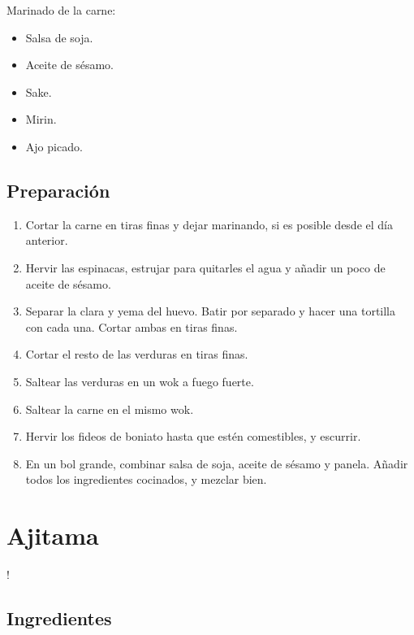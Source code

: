 \documentclass[
]{book}
\providecommand{\tightlist}{%
  \setlength{\itemsep}{0pt}\setlength{\parskip}{0pt}}
\begin{document}
Marinado de la carne:

\begin{itemize}
\tightlist
\item
  Salsa de soja.
\item
  Aceite de sésamo.
\item
  Sake.
\item
  Mirin.
\item
  Ajo picado.
\end{itemize}

\hypertarget{preparaciuxf3n-6}{%
\section*{Preparación}\label{preparaciuxf3n-6}}

\begin{enumerate}
\def\labelenumi{\arabic{enumi}.}
\tightlist
\item
  Cortar la carne en tiras finas y dejar marinando, si es posible desde el día anterior.
\item
  Hervir las espinacas, estrujar para quitarles el agua y añadir un poco de aceite de sésamo.
\item
  Separar la clara y yema del huevo. Batir por separado y hacer una tortilla con cada una. Cortar ambas en tiras finas.
\item
  Cortar el resto de las verduras en tiras finas.
\item
  Saltear las verduras en un wok a fuego fuerte.
\item
  Saltear la carne en el mismo wok.
\item
  Hervir los fideos de boniato hasta que estén comestibles, y escurrir.
\item
  En un bol grande, combinar salsa de soja, aceite de sésamo y panela. Añadir todos los ingredientes cocinados, y mezclar bien.
\end{enumerate}

\hypertarget{ajitama}{%
\chapter{Ajitama}\label{ajitama}}

!

\hypertarget{ingredientes-7}{%
\section*{Ingredientes}\label{ingredientes-7}}
\end{document}
